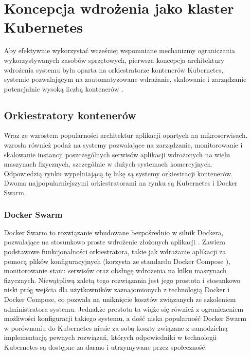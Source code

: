 \section{Koncepcja wdrożenia jako klaster Kubernetes}
Aby efektywnie wykorzystać wcześniej wspomniane mechanizmy ograniczania wykorzystywanych zasobów sprzętowych, pierwsza koncepcja architektury wdrożenia systemu była oparta na orkiestratorze kontenerów Kubernetes, systemie pozwalającym na zautomatyzowane wdrażanie, skalowanie i zarządzanie potencjalnie wysoką liczbą kontenerów \cite{k8sMain}.

\subsection{Orkiestratory kontenerów}
Wraz ze wzrostem popularności architektur aplikacji opartych na mikroserwisach, wzrosła również podaż na systemy pozwalające na zarządzanie, monitorowanie i skalowanie instancji poszczególnych serwisów aplikacji wdrożonych na wielu maszynach fizycznych, szczególnie w dużych systemach komercyjnych. Odpowiedzią rynku wypełniającą tę lukę są systemy orkiestracji kontenerów. Dwoma najpopularniejszymi orkiestratorami na rynku są Kubernetes i Docker Swarm.

\subsubsection{Docker Swarm}
Docker Swarm to rozwiązanie wbudowane bezpośrednio w silnik Dockera, pozwalające na stosunkowo proste wdrożenie złożonych aplikacji \cite{dockerSwarm}. Zawiera podstawowe funkcjonalności orkiestratora, takie jak wdrażanie aplikacji za pomocą plików konfiguracyjnych (korzysta ze standardu Docker Compose \cite{dockerCompose}), monitorowanie stanu serwisów oraz obsługę wdrożenia na kilku maszynach fizycznych. Niewątpliwą zaletą tego rozwiązania jest jego prostota i stosunkowo niski próg wejścia dla użytkowników zaznajomionych z technologią Docker i Docker Compose, co pozwala na uniknięcie kosztów związanych ze szkoleniem administratora systemu. Jednakże prostota ta wiąże się również z ograniczeniem możliwości konfiguracji takiego systemu, a dość niska popularność Docker Swarm w porównaniu do Kubernetes niesie za sobą koszty związane z samodzielną implementacją pewnych rozwiązań, których odpowiedniki w technologii Kubernetes są dostępne za darmo i utrzymywane przez społeczność.
